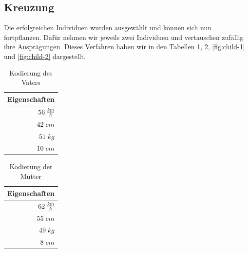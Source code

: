         \subsection{Kreuzung} \label{crossover}
            Die erfolgreichen Individuen wurden ausgewählt und können sich nun fortpflanzen. Dafür nehmen wir jeweils zwei Individuen und vertauschen zufällig ihre Ausprägungen. Dieses Verfahren haben wir in den Tabellen \ref{fig:enc-dad}, \ref{fig:enc-mom}, \ref{fig:child-1} und \ref{fig:child-2} dargestellt.
            \\[4mm]
            \begin{multicols}{2}
                \begin{table}[H]
                    \begin{center}
                    \begin{tabular}{ |r| } 
                        \hline
                        \hfill Eigenschaften  \\ \hline
                        \cellcolor{blue!25} $ 56\; \frac{km}{h}$ \\ \hline
                        \cellcolor{blue!25} $ 42\; cm          $ \\ \hline
                        \cellcolor{blue!25} $ 51\; kg          $ \\ \hline
                        \cellcolor{blue!25} $ 10\; cm          $ \\ \hline
                    \end{tabular}
                    \end{center}
                    \caption{Kodierung des Vaters \label{fig:enc-dad}}
                \end{table}

                \begin{table}[H]
                    \begin{center}
                    \begin{tabular}{ |r| } 
                        \hline
                        \hfill Eigenschaften  \\ \hline
                        \cellcolor{yellow!25} $ 62\; \frac{km}{h}$ \\ \hline
                        \cellcolor{yellow!25} $ 55\; cm          $ \\ \hline
                        \cellcolor{yellow!25} $ 49\; kg          $ \\ \hline
                        \cellcolor{yellow!25} $  8\; cm          $ \\ \hline
                    \end{tabular}
                    \end{center}
                    \caption{Kodierung der Mutter \label{fig:enc-mom}}
                \end{table}

            \end{multicols}

